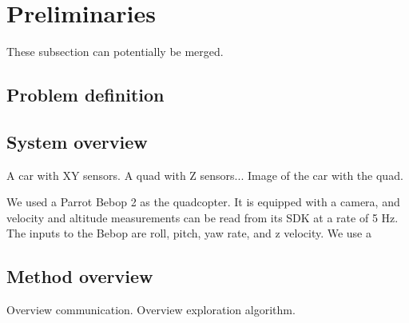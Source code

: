 
\section{Preliminaries}

These subsection can potentially be merged.

\subsection{Problem definition}


\subsection{System overview}
A car with XY sensors. A quad with Z sensors...
Image of the car with the quad.

We used a Parrot Bebop 2 as the quadcopter. It is
equipped with a camera, and velocity and altitude
measurements can be read from its SDK at a rate of
5 Hz. The inputs to the Bebop are roll, pitch, yaw rate,
and z velocity. We use a 

\subsection{Method overview}
Overview communication.
Overview exploration algorithm.